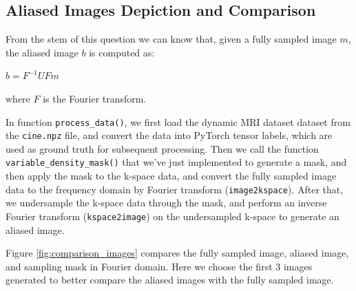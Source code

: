 \documentclass{article}
\begin{document}
\subsection{Aliased Images Depiction and Comparison}
From the stem of this question we can know that, given a fully sampled image $m$,
the aliased image $b$ is computed as: 
\begin{center}
  $b = F^{-1} U F m$
\end{center}
where $F$ is the Fourier transform.

In function \texttt{process\_data()}, we first load the dynamic MRI dataset dataset from the \texttt{cine.npz} file,
and convert the data into PyTorch tensor labels, which are used as ground truth for subsequent processing. Then we
call the function \texttt{variable\_density\_mask()} that we've just implemented to generate a mask,
and then apply the mask to the k-space data, and convert the fully sampled image data to the frequency
domain by Fourier transform (\texttt{image2kspace}). After that, we undersample the k-space data through the mask,
and perform an inverse Fourier transform (\texttt{kspace2image}) on the undersampled k-space to generate an aliased image.

Figure \ref{fig:comparison_images} compares the fully sampled image, aliased image, and sampling mask in Fourier domain.
Here we choose the first 3 images generated to better compare the aliased images with the fully sampled image.
\end{document}
